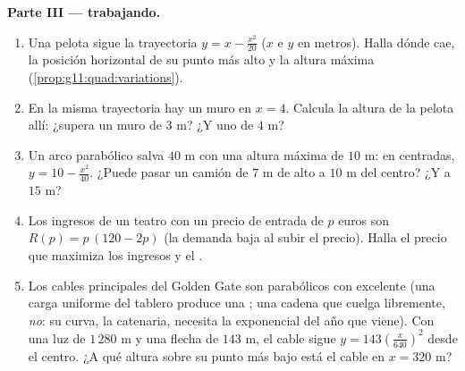 \begin{problem}
\medskip
\noindent\textbf{Parte III ---  trabajando.}
\begin{enumerate}[resume]
  \item Una pelota sigue la trayectoria $y = x - \frac{x^2}{20}$ ($x$ e
        $y$ en metros). Halla dónde cae, la posición horizontal de su
        punto más alto y la altura máxima
        (\cref{prop:g11:quad:variations}).
  \item En la misma trayectoria hay un muro en $x = 4$. Calcula la altura
        de la pelota allí: ¿supera un muro de $3$ m? ¿Y uno de $4$ m?
  \item Un arco parabólico salva $40$ m con una altura máxima de $10$ m:
        en  centradas, $y = 10 - \frac{x^2}{40}$. ¿Puede pasar
        un camión de $7$ m de alto a $10$ m del centro? ¿Y a $15$ m?
  \item Los ingresos de un teatro con un precio de entrada de $p$ euros
        son $R(p) = p\,(120 - 2p)$ (la demanda baja al subir el precio).
        Halla el precio que maximiza los ingresos y el .
  \item Los cables principales del Golden Gate son parabólicos con
        excelente  (una carga uniforme del tablero produce una
        ; una cadena que cuelga libremente, \emph{no}: su curva,
        la catenaria, necesita la exponencial del año que viene). Con una
        luz de $1\,280$ m y una flecha de $143$ m, el cable sigue
        $y = 143\left(\frac{x}{640}\right)^2$ desde el centro. ¿A qué
        altura sobre su punto más bajo está el cable en $x = 320$ m?
\end{enumerate}


\end{problem}
